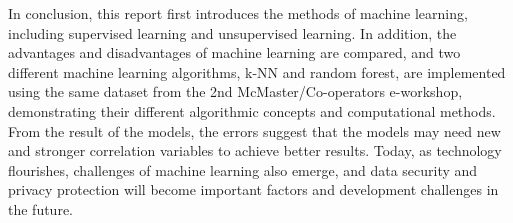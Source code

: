 \documentclass[12pt]{article} %
\theoremstyle{definition}
\begin{document}
In conclusion, this report first introduces the methods of machine learning, including supervised learning and unsupervised learning. In addition, the advantages and disadvantages of machine learning are compared, and two different machine learning algorithms, k-NN and random forest, are implemented using the same dataset from the 2nd McMaster/Co-operators e-workshop, demonstrating their different algorithmic concepts and computational methods. From the result of the models, the errors suggest that the models may need new and stronger correlation variables to achieve better results. Today, as technology flourishes, challenges of machine learning also emerge, and data security and privacy protection will become important factors and development challenges in the future.



 

\newpage

\end{document}
